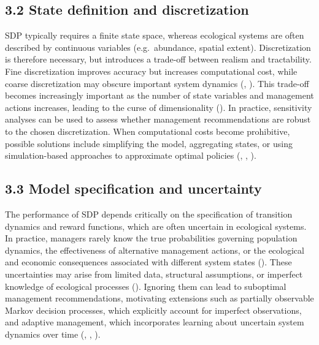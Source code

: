 \documentclass[
  11pt,
  a4paper,
]{article}
\begin{document}
\subsection{3.2 State definition and discretization}\label{state-definition-and-discretization}

SDP typically requires a finite state space, whereas ecological systems are often described by continuous variables (e.g.~abundance, spatial extent). Discretization is therefore necessary, but introduces a trade-off between realism and tractability. Fine discretization improves accuracy but increases computational cost, while coarse discretization may obscure important system dynamics (, ). This trade-off becomes increasingly important as the number of state variables and management actions increases, leading to the curse of dimensionality (). In practice, sensitivity analyses can be used to assess whether management recommendations are robust to the chosen discretization. When computational costs become prohibitive, possible solutions include simplifying the model, aggregating states, or using simulation-based approaches to approximate optimal policies (, , ).

\subsection{3.3 Model specification and uncertainty}\label{model-specification-and-uncertainty}

The performance of SDP depends critically on the specification of transition dynamics and reward functions, which are often uncertain in ecological systems. In practice, managers rarely know the true probabilities governing population dynamics, the effectiveness of alternative management actions, or the ecological and economic consequences associated with different system states (). These uncertainties may arise from limited data, structural assumptions, or imperfect knowledge of ecological processes (). Ignoring them can lead to suboptimal management recommendations, motivating extensions such as partially observable Markov decision processes, which explicitly account for imperfect observations, and adaptive management, which incorporates learning about uncertain system dynamics over time (, , ).
\end{document}
